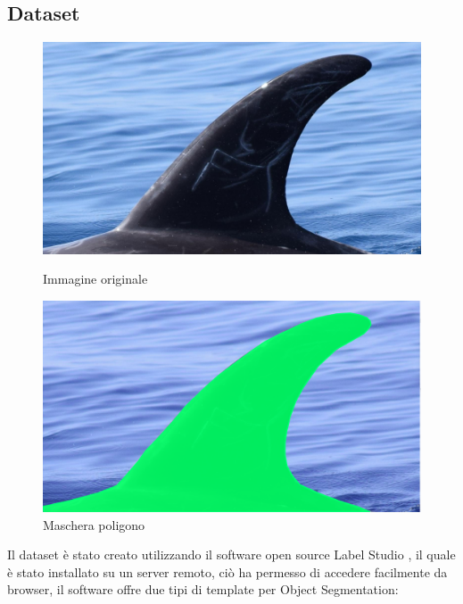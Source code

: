 \documentclass[a4paper,12pt]{report}
\begin{document}
      \subsection{Dataset}
      \begin{figure}[H]
        \centering
        \begin{minipage}{0.4\textwidth}
          \centering
          \includegraphics[width=\textwidth]{assets/images/methods/deep/dataset/original.png}   
          \caption{Immagine originale}
        \end{minipage}
        \begin{minipage}{0.4\textwidth}
          \centering
          \includegraphics[width=\textwidth]{assets/images/methods/deep/dataset/mask.png}   
          \caption{Maschera poligono}
        \end{minipage}
      \end{figure}
      Il dataset è stato creato utilizzando il software open source Label Studio \cite{labelstudio}, il quale è stato installato su un server
      remoto, ciò ha permesso di accedere facilmente da browser, il software offre due tipi di 
      template per Object Segmentation:
\end{document}
